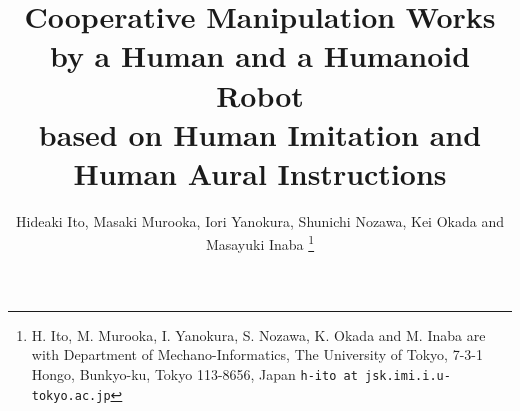 \documentclass[letterpaper, 10 pt, conference]{ieeeconf}  %
\title{\LARGE \bf
Cooperative Manipulation Works by a Human and a Humanoid Robot \\
based on Human Imitation and Human Aural Instructions
}
\author{Hideaki Ito, Masaki Murooka, Iori Yanokura, Shunichi Nozawa, Kei Okada and Masayuki Inaba%
\thanks{H. Ito, M. Murooka, I. Yanokura, S. Nozawa, K. Okada and M. Inaba are with Department of Mechano-Informatics, The University of Tokyo, 7-3-1 Hongo, Bunkyo-ku, Tokyo 113-8656, Japan
        {\tt\small h-ito at jsk.imi.i.u-tokyo.ac.jp}}%
}
\begin{document}
\maketitle
\thispagestyle{empty}
\pagestyle{empty}

\setlength{\floatsep}{2pt} %
\setlength{\textfloatsep}{2pt} %



\begin{abstract}

\end{abstract}







\addtolength{\textheight}{-12cm}   %




\end{document}
